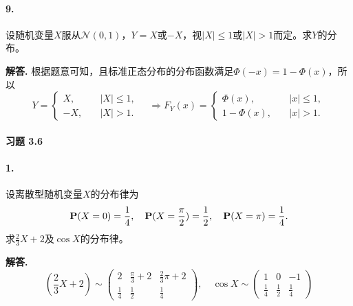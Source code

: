 \documentclass[12pt, a4paper, oneside]{ctexart}
\newenvironment{solution}{\par\noindent\textbf{解答. }}{\bigskip\par}
\begin{document}
\paragraph{9.}设随机变量$X$服从$\mathcal{N}(0,1)$，$Y=X$或$-X$，视$|X|\leqslant 1$或$|X|>1$而定。求$Y$的分布。
\begin{solution}
    根据题意可知，且标准正态分布的分布函数满足$\Phi(-x) = 1-\Phi(x)$，所以
    \begin{equation*}
        Y = 
        \begin{cases}
            X,\quad&|X|\leqslant 1,\\
            -X,\quad&|X| > 1.
        \end{cases}
        \quad\Rightarrow
        F_Y(x) = \begin{cases}
            \Phi(x),\quad&|x|\leqslant 1,\\
            1-\Phi(x),\quad&|x| > 1.
        \end{cases}
    \end{equation*}
\end{solution}
\paragraph{习题 3.6}
\def\disp{\displaystyle}
\paragraph{1.}设离散型随机变量$X$的分布律为
\begin{equation*}
    \P(X=0)=\frac{1}{4},\quad\P(X=\frac{\pi}{2})=\frac{1}{2},\quad\P(X=\pi)=\frac{1}{4}.
\end{equation*}
求$\disp\frac{2}{3}X+2$及$\disp\cos X$的分布律。
\begin{solution}
    \begin{equation*}
        (\frac{2}{3}X+2)\sim\left(\begin{matrix}
            2&\frac{\pi}{3}+2&\frac{2}{3}\pi+2\\
            \frac{1}{4}&\frac{1}{2}&\frac{1}{4}
        \end{matrix}\right),\quad
        \cos X\sim\left(\begin{matrix}
            1&0&-1\\
            \frac{1}{4}&\frac{1}{2}&\frac{1}{4}
        \end{matrix}\right)
    \end{equation*}
\end{solution}
\end{document}
